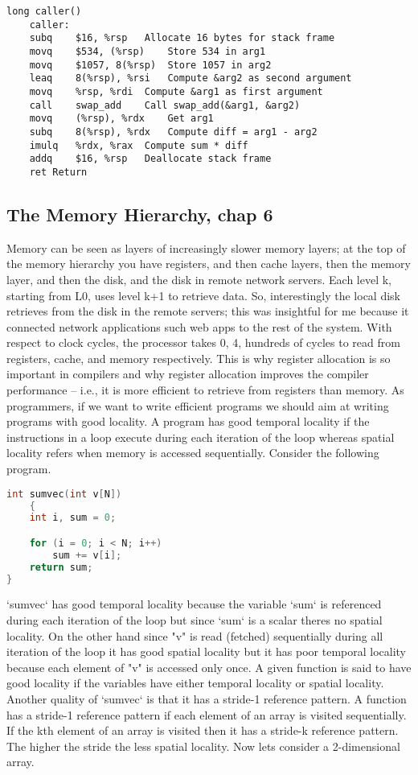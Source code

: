 \documentclass[10pt]{article}
\begin{document}
\begin{lstlisting}
long caller()
	caller:
	subq	$16, %rsp	Allocate 16 bytes for stack frame
	movq	$534, (%rsp)	Store 534 in arg1
	movq	$1057, 8(%rsp)	Store 1057 in arg2
	leaq	8(%rsp), %rsi	Compute &arg2 as second argument
	movq	%rsp, %rdi	Compute &arg1 as first argument
	call	swap_add	Call swap_add(&arg1, &arg2)
	movq	(%rsp), %rdx	Get arg1
	subq	8(%rsp), %rdx	Compute diff = arg1 - arg2
	imulq	%rdx, %rax	Compute sum * diff
	addq	$16, %rsp	Deallocate stack frame
	ret Return
\end{lstlisting}

\subsection{The Memory Hierarchy, chap 6}
Memory can be seen as layers of increasingly slower memory layers; at the top of the memory hierarchy you have registers, and then cache layers, then the memory layer, and then the disk, and the disk in remote network servers. Each level k, starting from L0, uses level k+1 to retrieve data. So, interestingly the local disk retrieves from the disk in the remote servers; this was insightful for me because it connected network applications such web apps to the rest of the system. With respect to clock cycles, the processor takes 0, 4, hundreds of cycles to read from registers, cache, and memory respectively. This is why register allocation is so important in compilers and why register allocation improves the compiler performance -- i.e., it is more efficient to retrieve from registers than memory. As programmers, if we want to write efficient programs we should aim at writing programs with good locality. A program has good temporal locality if the instructions in a loop execute during each iteration of the loop whereas spatial locality refers when memory is accessed sequentially. Consider the following program.

\begin{lstlisting}[language=C]
int sumvec(int v[N])
	{
	int i, sum = 0;

	for (i = 0; i < N; i++)
		sum += v[i];
	return sum;
}
\end{lstlisting}
`sumvec` has good temporal locality because the variable `sum` is referenced during each iteration of the loop but since `sum` is a scalar theres no spatial locality. On the other hand since "v" is read (fetched) sequentially during all iteration of the loop it has good spatial locality but it has poor temporal locality because each element of "v" is accessed only once. A given function is said to have good locality if the variables have either temporal locality or spatial locality. Another quality of `sumvec` is that it has a stride-1 reference pattern. A function has a stride-1 reference pattern if each element of an array is visited sequentially. If the kth element of an array is visited then it has a stride-k reference pattern. The higher the stride the less spatial locality. Now lets consider a 2-dimensional array.
\end{document}
